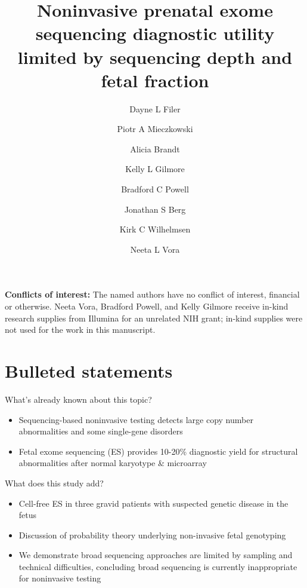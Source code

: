 \documentclass{article}\usepackage[]{graphicx}\usepackage[]{color}
\begin{document}
\title{Noninvasive prenatal exome sequencing diagnostic utility limited by sequencing depth and fetal fraction}

\author[1,2,*]{Dayne L Filer}
\author[1]{Piotr A Mieczkowski}
\author[1]{Alicia Brandt}
\author[3]{Kelly L Gilmore}
\author[1,2]{Bradford C Powell}
\author[1]{Jonathan S Berg}
\author[1,2,4]{Kirk C Wilhelmsen}
\author[1,3]{Neeta L Vora}
\date{}

\maketitle

\textbf{Conflicts of interest:} The named authors have no conflict of interest, financial or otherwise. Neeta Vora, Bradford Powell, and Kelly Gilmore receive in-kind research supplies from Illumina for an unrelated NIH grant; in-kind supplies were not used for the work in this manuscript.

\section*{Bulleted statements}

What's already known about this topic?
\begin{itemize}
    \item Sequencing-based noninvasive testing detects large copy number abnormalities and some single-gene disorders
    \item Fetal exome sequencing (ES) provides 10-20\% diagnostic yield for structural abnormalities after normal karyotype \& microarray
\end{itemize}

What does this study add?
\begin{itemize}
    \item Cell-free ES in three gravid patients with suspected genetic disease in the fetus
    \item Discussion of probability theory underlying non-invasive fetal genotyping
    \item We demonstrate broad sequencing approaches are limited by sampling and technical difficulties, concluding broad sequencing is currently inappropriate for noninvasive testing
\end{itemize}
\end{document}

